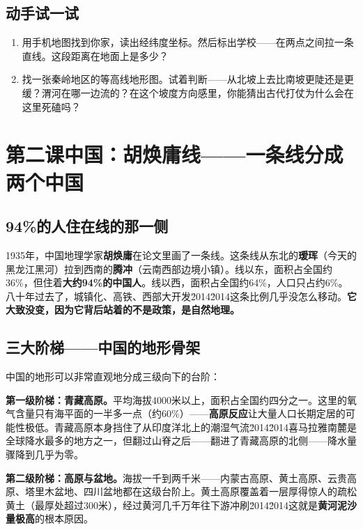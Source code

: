 \documentclass[a4paper,12pt]{ctexart}
\begin{document}
\subsection*{动手试一试}

\begin{enumerate}
  \item 用手机地图找到你家，读出经纬度坐标。然后标出学校——在两点之间拉一条直线。这段距离在地面上是多少？
  \item 找一张秦岭地区的等高线地形图。试着判断——从北坡上去比南坡更陡还是更缓？渭河在哪一边流的？在这个坡度方向感里，你能猜出古代打仗为什么会在这里死磕吗？
\end{enumerate}

\newpage

\section{\textcolor{orange!80!black}{第二课\quad 中国：胡焕庸线——一条线分成两个中国}}

\subsection*{94\%的人住在线的那一侧}

1935年，中国地理学家\textbf{胡焕庸}在论文里画了一条线。这条线从东北的\textbf{瑷珲}（今天的黑龙江黑河）拉到西南的\textbf{腾冲}（云南西部边境小镇）。线以东，面积占全国约36\%，但住着\textbf{大约94\%的中国人}。线以西，面积占全国约64\%，人口只占约6\%。八十年过去了，城镇化、高铁、西部大开发\u2014\u2014这条比例几乎没怎么移动。\textbf{它大致没变，因为它背后站着的不是政策，是自然地理。}

\subsection*{三大阶梯——中国的地形骨架}

中国的地形可以非常直观地分成三级向下的台阶：

\textbf{第一级阶梯：青藏高原。}平均海拔4000米以上，面积占全国约四分之一。这里的氧气含量只有海平面的一半多一点（约60\%）——\textbf{高原反应}让大量人口长期定居的可能性极低。青藏高原本身挡住了从印度洋北上的潮湿气流\u2014\u2014喜马拉雅南麓是全球降水最多的地方之一，但翻过山脊之后——翻进了青藏高原的北侧——降水量骤降到几乎为零。

\textbf{第二级阶梯：高原与盆地。}海拔一千到两千米——内蒙古高原、黄土高原、云贵高原、塔里木盆地、四川盆地都在这级台阶上。黄土高原覆盖着一层厚得惊人的疏松黄土（最厚处超过300米），经过黄河几千万年往下游冲刷\u2014\u2014这就是\textbf{黄河泥沙量极高}的根本原因。
\end{document}
